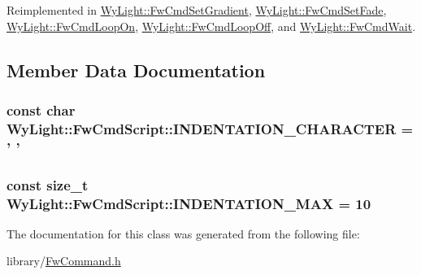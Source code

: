 Reimplemented in \hyperlink{struct_wy_light_1_1_fw_cmd_set_gradient_ab29979311cc5a3e8936d634ece99f78b}{Wy\-Light\-::\-Fw\-Cmd\-Set\-Gradient}, \hyperlink{struct_wy_light_1_1_fw_cmd_set_fade_a2e6cf2016152c098c3b9706c43747010}{Wy\-Light\-::\-Fw\-Cmd\-Set\-Fade}, \hyperlink{struct_wy_light_1_1_fw_cmd_loop_on_a07f681b0fff3b0a64017f63d1d8dfc5d}{Wy\-Light\-::\-Fw\-Cmd\-Loop\-On}, \hyperlink{struct_wy_light_1_1_fw_cmd_loop_off_ac4afc42d823339073264a7e0ba1d7ad9}{Wy\-Light\-::\-Fw\-Cmd\-Loop\-Off}, and \hyperlink{class_wy_light_1_1_fw_cmd_wait_a8d96368a646e49b02058891417188d86}{Wy\-Light\-::\-Fw\-Cmd\-Wait}.



\subsection{Member Data Documentation}
\hypertarget{class_wy_light_1_1_fw_cmd_script_a8cb5ea593860ed67f2d2a0c775f9a590}{
\subsubsection[{I\-N\-D\-E\-N\-T\-A\-T\-I\-O\-N\-\_\-\-C\-H\-A\-R\-A\-C\-T\-E\-R}]{\setlength{\rightskip}{0pt plus 5cm}const char Wy\-Light\-::\-Fw\-Cmd\-Script\-::\-I\-N\-D\-E\-N\-T\-A\-T\-I\-O\-N\-\_\-\-C\-H\-A\-R\-A\-C\-T\-E\-R = ' '\hspace{0.3cm}{\ttfamily [static]}}}\label{class_wy_light_1_1_fw_cmd_script_a8cb5ea593860ed67f2d2a0c775f9a590}
\hypertarget{class_wy_light_1_1_fw_cmd_script_ab071e02170fbedc26196dece08682379}{
\subsubsection[{I\-N\-D\-E\-N\-T\-A\-T\-I\-O\-N\-\_\-\-M\-A\-X}]{\setlength{\rightskip}{0pt plus 5cm}const size\-\_\-t Wy\-Light\-::\-Fw\-Cmd\-Script\-::\-I\-N\-D\-E\-N\-T\-A\-T\-I\-O\-N\-\_\-\-M\-A\-X = 10\hspace{0.3cm}{\ttfamily [static]}}}\label{class_wy_light_1_1_fw_cmd_script_ab071e02170fbedc26196dece08682379}


The documentation for this class was generated from the following file\-:\begin{DoxyCompactItemize}
\item 
library/\hyperlink{_fw_command_8h}{Fw\-Command.\-h}\end{DoxyCompactItemize}
